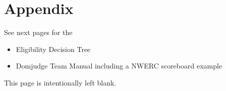 \documentclass[11pt]{report}
\begin{document}
\chapter{Appendix}
See next pages for the
\begin{itemize}
\item Eligibility Decision Tree
\item Domjudge Team Manual including a NWERC scoreboard example
\end{itemize}
\clearpage



\begin{center}
\vspace*{\fill}
This page is intentionally left blank.
\vspace*{\fill}
\end{center}
\clearpage


\end{document}

